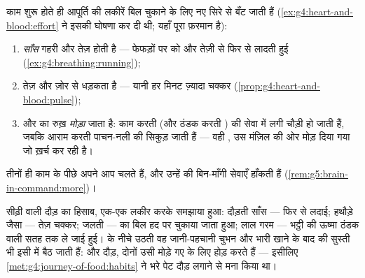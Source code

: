 \begin{proposition}[शरीर अपनी आपूर्ति नए सिरे से बाँटता है]\label{prop:g7:organs-at-work:supply}
काम शुरू होते ही आपूर्ति की लकीरें बिल चुकाने के लिए नए सिरे से बँट
जाती हैं (\cref{ex:g4:heart-and-blood:effort} ने इसकी घोषणा कर दी थी;
यहाँ पूरा फ़रमान है):
\begin{enumerate}
  \item \emph{साँस} गहरी और तेज़ होती है --- फेफड़ों पर  को और तेज़ी
        से फिर से लादती हुई (\cref{ex:g4:breathing:running});
  \item \emph{} तेज़ और ज़ोर से धड़कता है --- यानी हर मिनट ज़्यादा
        चक्कर (\cref{prop:g4:heart-and-blood:pulse});
  \item और  का रुख़ \emph{मोड़ा} जाता है: काम करती  (और
        ठंडक करती ) की सेवा में लगी  चौड़ी हो जाती हैं,
        जबकि आराम करती पाचन-नली की सिकुड़ जाती हैं --- वही , उस
        मंज़िल की ओर मोड़ दिया गया जो ख़र्च कर रही है।
\end{enumerate}
तीनों ही काम के पीछे अपने आप चलते हैं, और उन्हें  की बिन-माँगी
सेवाएँ हाँकती हैं (\cref{rem:g5:brain-in-command:more})।
\end{proposition}
\admitted

\begin{example}[फ़रमान, भीतर से महसूस किया हुआ]\label{ex:g7:organs-at-work:felt}
सीढ़ी वाली दौड़ का हिसाब, एक-एक लकीर करके समझाया हुआ: दौड़ती साँस ---
फिर से लदाई; हथौड़े जैसा  --- तेज़ चक्कर; जलती  ---  का
बिल हद पर चुकाया जाता हुआ; लाल गरम  --- भट्ठी की ऊष्मा ठंडक वाली
सतह तक ले जाई हुई।  के नीचे उठती वह जानी-पहचानी चुभन और भारी खाने के
बाद की सुस्ती भी इसी में बैठ जाती हैं:  और दौड़, दोनों उसी मोड़े गए
 के लिए होड़ करते हैं --- इसीलिए
\cref{met:g4:journey-of-food:habits} ने भरे पेट दौड़ लगाने से मना किया
था।
\end{example}

